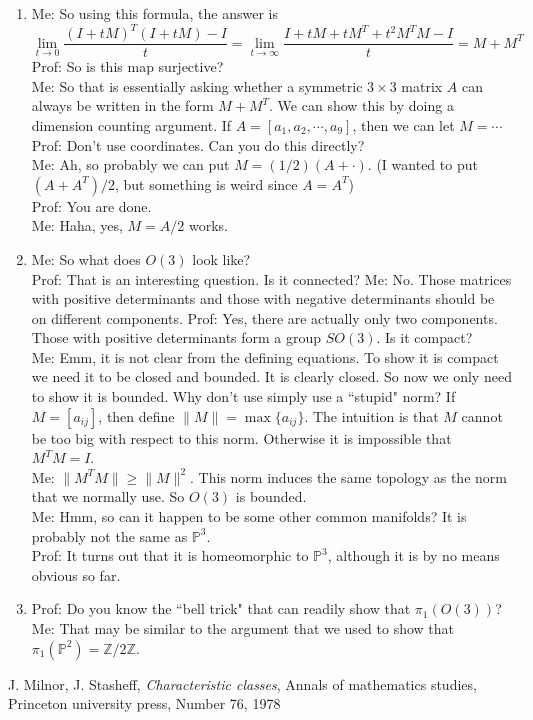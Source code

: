 \documentclass[12pt]{article}
\theoremstyle{plain}
\theoremstyle{definition}
\newcommand{\IP}{\mathbb{P}}
\newcommand{\IZ}{\mathbb{Z}}
\newcommand{\<}{\langle}
\renewcommand{\>}{\rangle}
\begin{document}
\begin{enumerate}
\item Me: So using this formula, the answer is 
$$ \lim_{t \to 0} \frac{(I  + tM)^T(I + tM) - I}{t} = \lim_{t \to \infty} \frac{I + tM + tM^T + t^2 M^T M - I}{t} = M + M^T $$
Prof: So is this map surjective? \\
Me: So that is essentially asking whether a symmetric $3 \times 3$ matrix $A$ can always be written in the form $M + M^T$. We can show this by doing a dimension counting argument. If $A = [ a_1, a_2, \cdots, a_9]$, then we can let $M = \cdots $\\
Prof: Don't use coordinates. Can you do this directly? \\
Me: Ah, so probably we can put $M = (1/2)(A + \cdot)$. (I wanted to put $(A + A^T)/2$, but something is weird since $A = A^T$)\\
Prof: You are done. \\
Me: Haha, yes, $M = A/2$ works.  

\item Me: So what does $O(3)$ look like? \\
Prof: That is an interesting question. Is it connected?
Me: No. Those matrices with positive determinants and those with negative determinants should be on different components. 
Prof: Yes, there are actually only two components. Those with positive determinants form a group $SO(3)$. Is it compact?\\
Me: Emm, it is not clear from the defining equations. To show it is compact we need it to be closed and bounded. It is clearly closed. So now we only need to show it is bounded. Why don't use simply use a ``stupid" norm? If $M = [a_{ij}]$, then define $\| M \| = \max \{a_{ij} \}$. The intuition is that $M$ cannot be too big with respect to this norm. Otherwise it is impossible that $M^T M = I$. \\
Me: $\| M^T M \| \ge \| M \|^2$. This norm induces the same topology as the norm that we normally use. So $O(3)$ is bounded. \\
Me: Hmm, so can it happen to be some other common manifolds? It is probably not the same as $\IP^3$. \\
Prof: It turns out that it is homeomorphic to $\IP^3$, although it is by no means obvious so far. 

\item Prof: Do you know the ``bell trick" that can readily show that $\pi_1(O(3))$? \\
Me: That may be similar to the argument that we used to show that $\pi_1(\IP^2) = \IZ/2\IZ$. 
\end{enumerate}



\begin{thebibliography}{9}


  J. Milnor, J. Stasheff, \textit{Characteristic classes}, Annals of mathematics studies, Princeton university press, Number 76, 1978
\end{thebibliography}
\end{document}

